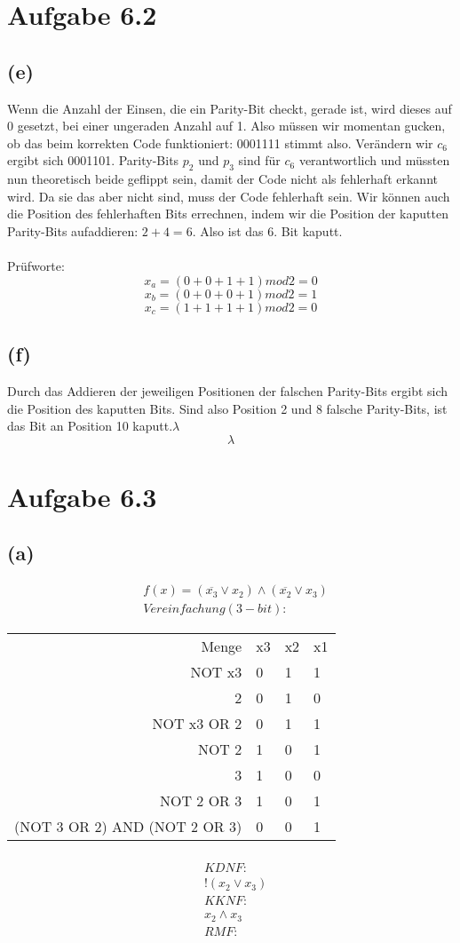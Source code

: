 \documentclass[12pt]{article}
\begin{document}
\section{Aufgabe 6.2}
\subsection{(e)}
Wenn die Anzahl der Einsen, die ein Parity-Bit checkt, gerade ist, wird dieses
auf 0 gesetzt, bei einer ungeraden Anzahl auf 1. Also müssen wir momentan
gucken, ob das beim korrekten Code funktioniert: 0001111 stimmt also.
Verändern wir \(c_6\) ergibt sich 0001101. Parity-Bits \(p_2\) und \(p_3\) sind für \(c_6\)
verantwortlich und müssten nun theoretisch beide geflippt sein, damit der Code
nicht als fehlerhaft erkannt wird. Da sie das aber nicht sind, muss der Code
fehlerhaft sein. Wir können auch die Position des fehlerhaften Bits errechnen,
indem wir die Position der kaputten Parity-Bits aufaddieren: \(2+4=6\). Also ist
das 6. Bit kaputt.\\\\
Prüfworte:
\[x_a = (0 + 0 + 1 + 1) mod 2 = 0\]
\[x_b = (0 + 0 + 0 + 1) mod 2 = 1\]
\[x_c = (1 + 1 + 1 + 1) mod 2 = 0\]

\subsection{(f)}
Durch das Addieren der jeweiligen Positionen der falschen Parity-Bits ergibt
sich die Position des kaputten Bits. Sind also Position 2 und 8 falsche
Parity-Bits, ist das Bit an Position 10 kaputt.\(\lambda\)\[\lambda\]

\section{Aufgabe 6.3}
\subsection{(a)}
\begin{align}
& f(x) = (\overline {x_3} \lor x_2) \land (\overline {x_2} \lor x_3)\\
&Vereinfachung (3-bit):
\end{align}
\begin{tabular} {r|l|l|l}
Menge & x3 & x2 & x1\\
NOT x3 & 0 & 1 & 1\\
2 & 0 & 1 & 0\\
NOT x3 OR 2 & 0 & 1 & 1\\
NOT 2 & 1 & 0 & 1\\
                           3  & 1 & 0 & 0\\
                   NOT 2 OR 3 & 1 & 0 & 1\\
(NOT 3 OR 2) AND (NOT 2 OR 3) & 0 & 0 & 1
\end{tabular}
\begin{align}
\\
& KDNF:\\
&! (x_2 \lor x_3)\\
& KKNF:\\
&x_2 \land x_3\\
& RMF:
\end{align}
\end{document}
